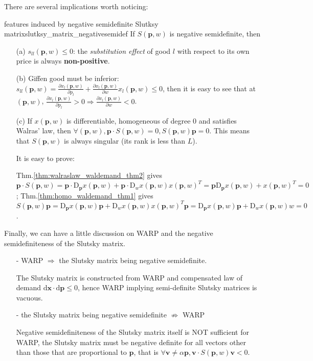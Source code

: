 There are several implications worth noticing:
\begin{theorem}{features induced by negative semidefinite Slutksy matrix}{slutksy_matrix_negativesemidef}
If $S(\mathbf{p},w)$ is negative semidefinite, then
    \begin{enumerate}
        \item[(a)] $s_{ll}(\mathbf{p},w)\leq 0$: the \textit{substitution effect} of good $l$ with respect to its own price is always \textbf{non-positive}.
        \item[(b)] Giffen good must be inferior: $s_{ll}(\mathbf{p},w)=\frac{\partial x_l(\mathbf{p},w)}{\partial p_l}+\frac{\partial x_l(\mathbf{p},w)}{\partial w}x_l(\mathbf{p},w)\leq 0$, then it is easy to see that at $(\mathbf{p},w)$, $\frac{\partial x_l(\mathbf{p},w)}{\partial p_l}>0\Rightarrow \frac{\partial x_l(\mathbf{p},w)}{\partial w}<0$.
        \item[(c)] If $ x(\mathbf{p},w)$ is differentiable, homogeneous of degree 0 and satisfies Walras' law, then $\forall (\mathbf{p},w), \mathbf{p}\cdot S(\mathbf{p},w)=0, S(\mathbf{p},w)\mathbf{p}=0$. This means that $S(\mathbf{p},w)$ is always singular (its rank is less than $L$).
        
        It is easy to prove:

        Thm.\ref{thm:walraslaw_waldemand_thm2} gives $\mathbf{p}\cdot S(\mathbf{p},w)=\mathbf{p}\cdot \mathrm{D}_{\mathbf{p}} x(\mathbf{p},w)+\mathbf{p}\cdot \mathrm{D}_w  x(\mathbf{p},w) x(\mathbf{p},w)^T =\mathbf{p}\mathrm{D}_{\mathbf{p}} x(\mathbf{p},w)+ x(\mathbf{p},w)^T=0$;
        Thm.\ref{thm:homo_waldemand_thm1} gives $S(\mathbf{p},w)\mathbf{p}=\mathrm{D}_{\mathbf{p}} x(\mathbf{p},w)\mathbf{p}+\mathrm{D}_w x(\mathbf{p},w) x(\mathbf{p},w)^T\mathbf{p}=\mathrm{D}_{\mathbf{p}} x(\mathbf{p},w)\mathbf{p}+\mathrm{D}_w x(\mathbf{p},w)w=0$.
    \end{enumerate}
\end{theorem}

Finally, we can have a little discussion on WARP and the negative semidefiniteness of the Slutsky matrix.

\begin{enumerate}
    \item[-] WARP $\Rightarrow$ the Slutsky matrix being negative semidefinite.
    
    The Slutsky matrix is constructed from WARP and compensated law of demand $\mathrm{d}\mathbf{x}\cdot \mathrm{d}\mathbf{p}\leq 0$, hence WARP implying semi-definite Slutsky matrices is vacuous.

    \item[-] the Slutsky matrix being negative semidefinite $\not\Rightarrow$ WARP
    
    Negative semidefiniteness of the Slutsky matrix itself is NOT sufficient for WARP, the Slutsky matrix must be negative definite for all vectors other than those that are proportional to $\mathbf{p}$, that is $\forall \mathbf{v}\neq \alpha \mathbf{p}, \mathbf{v}\cdot S(\mathbf{p},w)\mathbf{v}<0$.
    
\end{enumerate}

